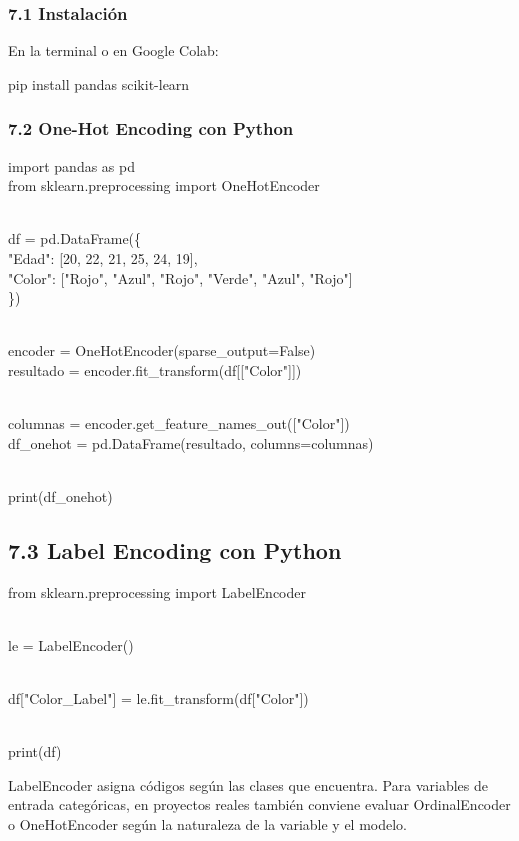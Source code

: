 \documentclass[]{article}
\begin{document}
\subsubsection{7.1 Instalación}\label{instalaciuxf3n}

En la terminal o en Google Colab:

pip install pandas scikit-learn

\subsubsection{7.2 One-Hot Encoding con
Python}\label{one-hot-encoding-con-python}

import pandas as pd\\
from sklearn.preprocessing import OneHotEncoder\\
\strut \\
df = pd.DataFrame(\{\\
"Edad": {[}20, 22, 21, 25, 24, 19{]},\\
"Color": {[}"Rojo", "Azul", "Rojo", "Verde", "Azul", "Rojo"{]}\\
\})\\
\strut \\
encoder = OneHotEncoder(sparse\_output=False)\\
resultado = encoder.fit\_transform(df{[}{[}"Color"{]}{]})\\
\strut \\
columnas = encoder.get\_feature\_names\_out({[}"Color"{]})\\
df\_onehot = pd.DataFrame(resultado, columns=columnas)\\
\strut \\
print(df\_onehot)

\subsection{7.3 Label Encoding con
Python}\label{label-encoding-con-python}

from sklearn.preprocessing import LabelEncoder\\
\strut \\
le = LabelEncoder()\\
\strut \\
df{[}"Color\_Label"{]} = le.fit\_transform(df{[}"Color"{]})\\
\strut \\
print(df)

LabelEncoder asigna códigos según las clases que encuentra. Para
variables de entrada categóricas, en proyectos reales también conviene
evaluar OrdinalEncoder o OneHotEncoder según la naturaleza de la
variable y el modelo.
\end{document}
